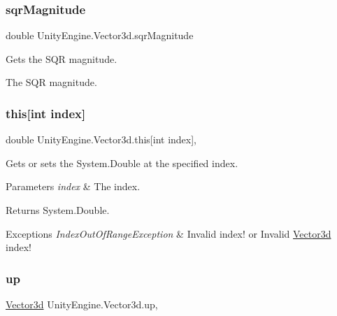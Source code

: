 \subsubsection{\texorpdfstring{sqr\+Magnitude}{sqrMagnitude}}
{\footnotesize\ttfamily double Unity\+Engine.\+Vector3d.\+sqr\+Magnitude\hspace{0.3cm}{\ttfamily [get]}}



Gets the S\+QR magnitude. 

The S\+QR magnitude.\mbox{\label{struct_unity_engine_1_1_vector3d_a2404ef1456e1698870aced7aca401ea1}} 
\subsubsection{\texorpdfstring{this[int index]}{this[int index]}}
{\footnotesize\ttfamily double Unity\+Engine.\+Vector3d.\+this\mbox{[}int index\mbox{]}\hspace{0.3cm}{\ttfamily [get]}, {\ttfamily [set]}}



Gets or sets the System.\+Double at the specified index. 


\begin{DoxyParams}{Parameters}
{\em index} & The index.\\
\hline
\end{DoxyParams}
\begin{DoxyReturn}{Returns}
System.\+Double.
\end{DoxyReturn}

\begin{DoxyExceptions}{Exceptions}
{\em Index\+Out\+Of\+Range\+Exception} & Invalid index! or Invalid \hyperlink{struct_unity_engine_1_1_vector3d}{Vector3d} index! \\
\hline
\end{DoxyExceptions}
\mbox{\label{struct_unity_engine_1_1_vector3d_accc4bb3fa788895b2e3ba9f61ddc60ca}} 
\subsubsection{\texorpdfstring{up}{up}}
{\footnotesize\ttfamily \hyperlink{struct_unity_engine_1_1_vector3d}{Vector3d} Unity\+Engine.\+Vector3d.\+up\hspace{0.3cm}{\ttfamily [static]}, {\ttfamily [get]}}



